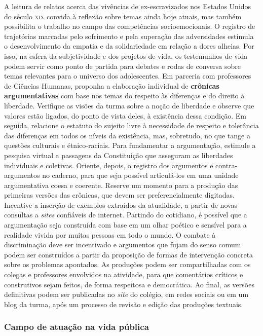 \documentclass[11pt]{extarticle}
\begin{document}
\begin{enumerate}
A leitura de relatos acerca das vivências de ex-escravizados nos
Estados Unidos do século \textsc{xix} convida à reflexão sobre temas ainda hoje
atuais, mas também possibilita o trabalho no campo das competências
socioemocionais. O registro de trajetórias marcadas pelo sofrimento e
pela superação das adversidades estimula o desenvolvimento da empatia
e da solidariedade em relação a dores alheias. Por isso, na esfera da
subjetividade e dos projetos de vida, os testemunhos de vida podem
servir como ponto de partida para debates e rodas de conversa sobre
temas relevantes para o universo dos adolescentes. Em parceria com
professores de Ciências Humanas, proponha a elaboração individual de
\textbf{crônicas argumentativas} com base nos temas do respeito às
diferenças e do direito à liberdade. Verifique as visões da turma
sobre a noção de liberdade e observe que valores estão ligados, do
ponto de vista deles, à existência dessa condição. Em seguida,
relacione o estatuto do sujeito livre à necessidade de respeito e
tolerância das diferenças em todos os níveis da existência, mas,
sobretudo, no que tange a questões culturais e étnico-raciais. Para
fundamentar a argumentação, estimule a pesquisa virtual a passagens da
Constituição que asseguram as liberdades individuais e coletivas.
Oriente, depois, o registro dos argumentos e contra-argumentos no
caderno, para que seja possível articulá-los em uma unidade
argumentativa coesa e coerente. Reserve um momento para a produção das
primeiras versões das crônicas, que devem ser preferencialmente
digitadas. Incentive a inserção de exemplos extraídos da atualidade, a
partir de novas consultas a \emph{sites} confiáveis de internet.
Partindo do cotidiano, é possível que a argumentação seja construída
com base em um olhar poético e sensível para a realidade vivida por
muitas pessoas em todo o mundo. O combate à discriminação deve ser
incentivado e argumentos que fujam do senso comum podem ser
construídos a partir da proposição de formas de intervenção concreta
sobre os problemas apontados. As produções podem ser compartilhadas
com os colegas e professores envolvidos na atividade, para que
comentários críticos e construtivos sejam feitos, de forma respeitosa
e democrática. Ao final, as versões definitivas podem ser publicadas
no \emph{site} do colégio, em redes sociais ou em um blog da turma,
após um processo de revisão e edição das produções textuais.

\subsubsection{Campo de atuação na vida pública}


\end{enumerate}
\end{document}
